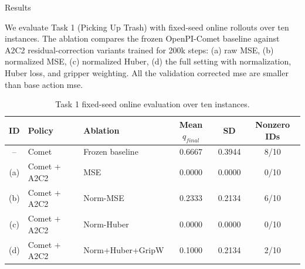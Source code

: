 \documentclass[final]{beamer}
\newlength{\colwidth}
\begin{document}
\begin{frame}[t]
\begin{columns}[t]
		\begin{column}{\colwidth}
			
			\begin{exampleblock}{Results}{}

				We evaluate Task 1 (Picking Up Trash) with fixed-seed online rollouts over
				ten instances.  The ablation compares the frozen OpenPI-Comet baseline
				against A2C2 residual-correction variants trained for 200k steps:
				(a) raw MSE, (b) normalized MSE, (c) normalized Huber, (d) the full setting with
				normalization, Huber loss, and gripper weighting. All the validation corrected mse are smaller than base action mse. 
		
				\begin{table}
						\centering
						\begin{tabular}{c l l c c c}
								\toprule
								\textbf{ID} & \textbf{Policy} & \textbf{Ablation} & \textbf{Mean $q_{final}$} & \textbf{SD} & \textbf{Nonzero IDs} \\
								\midrule
								-- & Comet & Frozen baseline & 0.6667 & 0.3944 & 8/10 \\
								(a) & Comet + A2C2 & MSE & 0.0000 & 0.0000 & 0/10 \\
								(b) & Comet + A2C2 & Norm-MSE & 0.2333 & 0.2134 & 6/10 \\
								(c) & Comet + A2C2 & Norm-Huber & 0.0000 & 0.0000 & 0/10 \\
								(d) & Comet + A2C2 & Norm+Huber+GripW & 0.1000 & 0.2134 & 2/10 \\
								\bottomrule
						\end{tabular}
						\caption{Task 1 fixed-seed online evaluation over ten instances.}
				\end{table}
		
		  \end{exampleblock}

				



\end{column}
\end{columns}
\end{frame}
\end{document}

